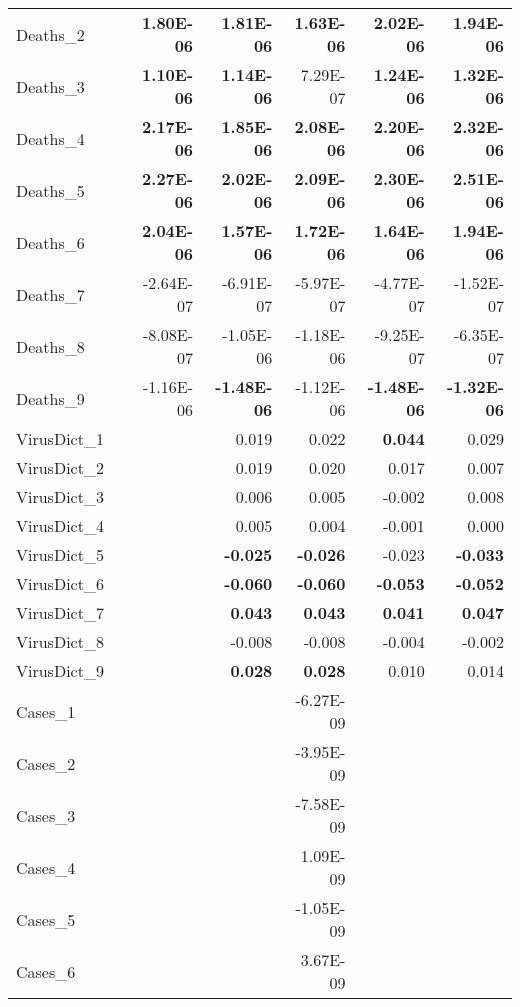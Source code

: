 \begin{longtable}[c]{@{}lrrrrrr@{}}
Deaths\_2 &  & \textbf{1.80E-06} & \textbf{1.81E-06} & \textbf{1.63E-06} & \textbf{2.02E-06} & \textbf{1.94E-06} \\
Deaths\_3 &  & \textbf{1.10E-06} & \textbf{1.14E-06} & 7.29E-07 & \textbf{1.24E-06} & \textbf{1.32E-06} \\
Deaths\_4 &  & \textbf{2.17E-06} & \textbf{1.85E-06} & \textbf{2.08E-06} & \textbf{2.20E-06} & \textbf{2.32E-06} \\
Deaths\_5 &  & \textbf{2.27E-06} & \textbf{2.02E-06} & \textbf{2.09E-06} & \textbf{2.30E-06} & \textbf{2.51E-06} \\
Deaths\_6 &  & \textbf{2.04E-06} & \textbf{1.57E-06} & \textbf{1.72E-06} & \textbf{1.64E-06} & \textbf{1.94E-06} \\
Deaths\_7 &  & -2.64E-07 & -6.91E-07 & -5.97E-07 & -4.77E-07 & -1.52E-07 \\
Deaths\_8 &  & -8.08E-07 & -1.05E-06 & -1.18E-06 & -9.25E-07 & -6.35E-07 \\
Deaths\_9 &  & -1.16E-06 & \textbf{-1.48E-06} & -1.12E-06 & \textbf{-1.48E-06} & \textbf{-1.32E-06} \\
VirusDict\_1 &  &  & 0.019 & 0.022 & \textbf{0.044} & 0.029 \\
VirusDict\_2 &  &  & 0.019 & 0.020 & 0.017 & 0.007 \\
VirusDict\_3 &  &  & 0.006 & 0.005 & -0.002 & 0.008 \\
VirusDict\_4 &  &  & 0.005 & 0.004 & -0.001 & 0.000 \\
VirusDict\_5 &  &  & \textbf{-0.025} & \textbf{-0.026} & -0.023 & \textbf{-0.033} \\
VirusDict\_6 &  &  & \textbf{-0.060} & \textbf{-0.060} & \textbf{-0.053} & \textbf{-0.052} \\
VirusDict\_7 &  &  & \textbf{0.043} & \textbf{0.043} & \textbf{0.041} & \textbf{0.047} \\
VirusDict\_8 &  &  & -0.008 & -0.008 & -0.004 & -0.002 \\
VirusDict\_9 &  &  & \textbf{0.028} & \textbf{0.028} & 0.010 & 0.014 \\
Cases\_1 &  &  &  & -6.27E-09 &  &  \\
Cases\_2 &  &  &  & -3.95E-09 &  &  \\
Cases\_3 &  &  &  & -7.58E-09 &  &  \\
Cases\_4 &  &  &  & 1.09E-09 &  &  \\
Cases\_5 &  &  &  & -1.05E-09 &  &  \\
Cases\_6 &  &  &  & 3.67E-09 &  &  \\

\end{longtable}
